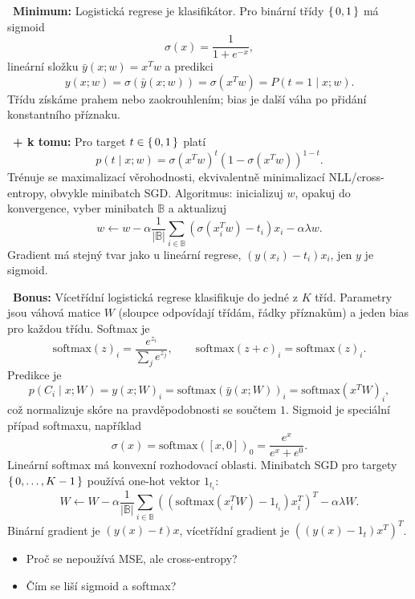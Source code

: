 \begin{odpoved}
\setlength{\parskip}{2pt}
\noindent{}\ \textbf{Minimum:} Logistická regrese je klasifikátor. Pro binární třídy $\{\,0,1\,\}$ má sigmoid
\[
\sigma(x)=\frac1{1+e^{-x}},
\]
lineární složku $\bar y(x;w)=x^Tw$ a predikci
\[
y(x;w)=\sigma(\bar y(x;w))=\sigma(x^Tw)=P(t=1\mid x;w).
\]
Třídu získáme prahem nebo zaokrouhlením; bias je další váha po přidání konstantního příznaku.\par
\noindent{}\ \textbf{+ k tomu:} Pro target $t\in\{\,0,1\,\}$ platí
\[
p(t\mid x;w)=\sigma(x^Tw)^t(1-\sigma(x^Tw))^{1-t}.
\]
Trénuje se maximalizací věrohodnosti, ekvivalentně minimalizací NLL/cross-entropy, obvykle minibatch SGD. Algoritmus: inicializuj $w$, opakuj do konvergence, vyber minibatch $\mathbb B$ a aktualizuj
\[
w\leftarrow w-\alpha\frac1{|\mathbb B|}
\sum_{i\in\mathbb B}(\sigma(x_i^Tw)-t_i)x_i-\alpha\lambda w.
\]
Gradient má stejný tvar jako u lineární regrese, $(y(x_i)-t_i)x_i$, jen $y$ je sigmoid.\par
\noindent{}\ \textbf{Bonus:} Vícetřídní logistická regrese klasifikuje do jedné z $K$ tříd. Parametry jsou váhová matice $W$ (sloupce odpovídají třídám, řádky příznakům) a jeden bias pro každou třídu. Softmax je
\[
\mathrm{softmax}(z)_i=\frac{e^{z_i}}{\sum_j e^{z_j}},
\qquad
\mathrm{softmax}(z+c)_i=\mathrm{softmax}(z)_i.
\]
Predikce je
\[
p(C_i\mid x;W)=y(x;W)_i
=\mathrm{softmax}(\bar y(x;W))_i
=\mathrm{softmax}(x^TW)_i,
\]
což normalizuje skóre na pravděpodobnosti se součtem $1$. Sigmoid je speciální případ softmaxu, například
\[
\sigma(x)=\mathrm{softmax}([x,0])_0=\frac{e^x}{e^x+e^0}.
\]
Lineární softmax má konvexní rozhodovací oblasti. Minibatch SGD pro targety $\{\,0,\dots,K-1\,\}$ používá one-hot vektor $1_{t_i}$:
\[
W\leftarrow W-\alpha\frac1{|\mathbb B|}
\sum_{i\in\mathbb B}
\left((\mathrm{softmax}(x_i^TW)-1_{t_i})x_i^T\right)^T
-\alpha\lambda W.
\]
Binární gradient je $(y(x)-t)x$, vícetřídní gradient je $((y(x)-1_t)x^T)^T$.
\end{odpoved}
\begin{recall}
\begin{itemize}[leftmargin=1.2em,itemsep=0pt,topsep=1pt]
  \item Proč se nepoužívá MSE, ale cross-entropy?
  \item Čím se liší sigmoid a softmax?
\end{itemize}
\end{recall}

